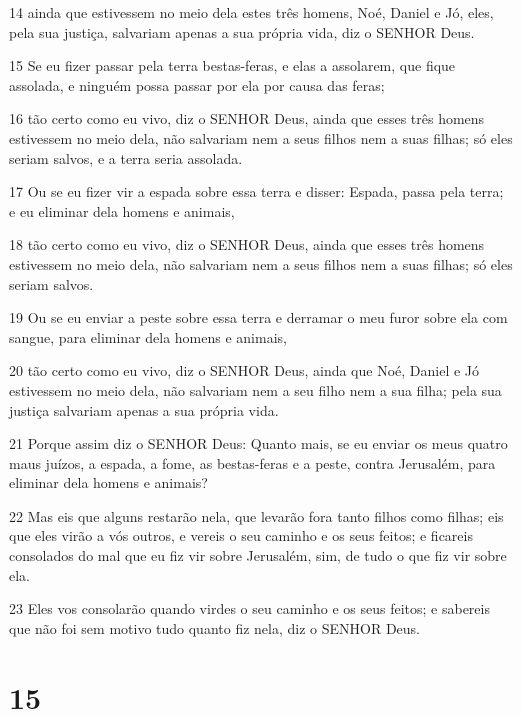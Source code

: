 \par 14 ainda que estivessem no meio dela estes três homens, Noé, Daniel e Jó, eles, pela sua justiça, salvariam apenas a sua própria vida, diz o SENHOR Deus.
\par 15 Se eu fizer passar pela terra bestas-feras, e elas a assolarem, que fique assolada, e ninguém possa passar por ela por causa das feras;
\par 16 tão certo como eu vivo, diz o SENHOR Deus, ainda que esses três homens estivessem no meio dela, não salvariam nem a seus filhos nem a suas filhas; só eles seriam salvos, e a terra seria assolada.
\par 17 Ou se eu fizer vir a espada sobre essa terra e disser: Espada, passa pela terra; e eu eliminar dela homens e animais,
\par 18 tão certo como eu vivo, diz o SENHOR Deus, ainda que esses três homens estivessem no meio dela, não salvariam nem a seus filhos nem a suas filhas; só eles seriam salvos.
\par 19 Ou se eu enviar a peste sobre essa terra e derramar o meu furor sobre ela com sangue, para eliminar dela homens e animais,
\par 20 tão certo como eu vivo, diz o SENHOR Deus, ainda que Noé, Daniel e Jó estivessem no meio dela, não salvariam nem a seu filho nem a sua filha; pela sua justiça salvariam apenas a sua própria vida.
\par 21 Porque assim diz o SENHOR Deus: Quanto mais, se eu enviar os meus quatro maus juízos, a espada, a fome, as bestas-feras e a peste, contra Jerusalém, para eliminar dela homens e animais?
\par 22 Mas eis que alguns restarão nela, que levarão fora tanto filhos como filhas; eis que eles virão a vós outros, e vereis o seu caminho e os seus feitos; e ficareis consolados do mal que eu fiz vir sobre Jerusalém, sim, de tudo o que fiz vir sobre ela.
\par 23 Eles vos consolarão quando virdes o seu caminho e os seus feitos; e sabereis que não foi sem motivo tudo quanto fiz nela, diz o SENHOR Deus.

\chapter{15}

